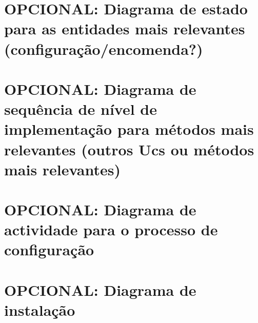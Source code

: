 \section{OPCIONAL: Diagrama de estado para as entidades mais relevantes
(configuração/encomenda?)}

\section{OPCIONAL: Diagrama de sequência de nível de implementação para métodos mais
relevantes (outros Ucs ou métodos mais relevantes)}

\section{OPCIONAL: Diagrama de actividade para o processo de configuração}

\section{OPCIONAL: Diagrama de instalação}